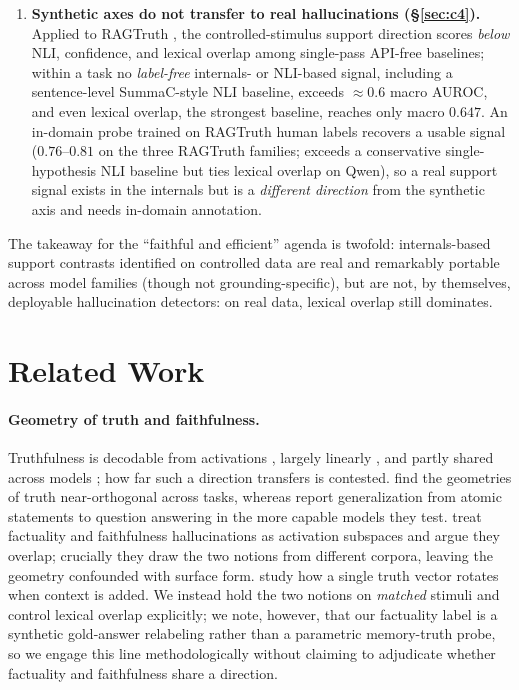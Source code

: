 \begin{enumerate}[leftmargin=1.4em,itemsep=1pt,topsep=2pt]
    more than the factuality axis at every one of $71$ layer-tests (mean $-0.142$), so
    confidence-purging does not separate the two notions.
  \item \textbf{Synthetic axes do not transfer to real hallucinations
    (\S\ref{sec:c4}).} Applied to RAGTruth \citep{niu2024ragtruth}, the
    controlled-stimulus support direction scores \emph{below} NLI, confidence, and
    lexical overlap among single-pass API-free baselines; within a task no
    \emph{label-free} internals- or NLI-based signal, including a sentence-level
    SummaC-style NLI baseline, exceeds
    ${\approx}0.6$ macro AUROC, and even lexical overlap, the strongest baseline, reaches only
    macro $0.647$. An in-domain probe trained on RAGTruth human
    labels recovers a usable signal ($0.76$--$0.81$ on the three RAGTruth families;
    exceeds a conservative single-hypothesis NLI baseline but ties lexical overlap on
    Qwen), so a real support signal exists in the internals but is a \emph{different
    direction} from the synthetic axis and needs in-domain annotation.
\end{enumerate}
The takeaway for the ``faithful and efficient'' agenda is twofold:
internals-based support contrasts identified on controlled data are real and
remarkably portable across model families (though not grounding-specific), but are
not, by themselves, deployable hallucination detectors: on real data, lexical
overlap still dominates.

\section{Related Work}
\label{sec:related}

\paragraph{Geometry of truth and faithfulness.}
Truthfulness is decodable from activations \citep{azaria2023saplma}, largely
linearly \citep{marks2024geometry}, and partly shared across models
\citep{burger2024truthuniversal}; how far such a direction transfers is contested.
\citet{azizian2025orthogonal} find the geometries of truth near-orthogonal across
tasks, whereas \citet{bao2025probing} report generalization from atomic statements to
question answering in the more capable models they test. \citet{wang2025space}
treat factuality and faithfulness hallucinations as activation subspaces and argue
they overlap; crucially they draw the two notions from different corpora, leaving
the geometry confounded with surface form. \citet{adarsh2026context} study how a
single truth vector rotates when context is added. We instead hold the two notions
on \emph{matched} stimuli and control lexical overlap explicitly; we note, however,
that our factuality label is a synthetic gold-answer relabeling rather than a
parametric memory-truth probe, so we engage this line methodologically without
claiming to adjudicate whether factuality and faithfulness share a direction.

